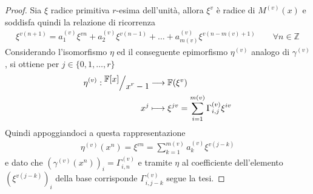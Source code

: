 \begin{proof}
   Sia $\xi$ radice primitiva $r$-esima dell'unità, allora $\xi^{v}$ è radice di $M^{(v)}(x)$ e soddisfa quindi la relazione di ricorrenza
   \begin{align*}
      \xi^{v(n+1)} = a_{1}^{(v)}\xi^{vn} + a_{2}^{(v)}\xi^{v(n-1)} + \dots  + a_{m(v)}^{(v)}\xi^{v(n-m(v)+1)}
      \qquad
      \forall n \in \mathbb{Z}
   \end{align*}
   Considerando l'isomorfismo $\eta$ ed il conseguente epimorfismo $\eta^{(v)}$ analogo di $\gamma^{(v)}$, si ottiene per $j \in \lbrace  0,1, \dots, r \rbrace$
   \begin{align*}
        \eta^{(v)} :  \quotient{\mathbb{F} \lbrack x \rbrack  }{x^{r} - 1}  
      & \longrightarrow  
       \mathbb{F} (\xi^{v})   \\
      x^{j} &\longmapsto  \xi^{jv} = \sum_{i=1}^{m(v)} \Gamma_{i,j}^{(v)}\xi^{iv}
   \end{align*}
   Quindi appoggiandoci a questa rappresentazione
   \begin{align*}
      \eta^{(v)}(x^n) = \xi^{vn} = \sum_{k=1}^{m(v)}a_{k}^{(v)}\xi^{v(j-k)}
   \end{align*}
   e dato che $(\gamma^{(v)}(x^{n}))_{i} = \Gamma_{i,n}^{(v)}$ e tramite $\eta$ al coefficiente dell'elemento $(\xi^{v(j-k)})_{i}$ della base corrisponde $\Gamma_{i,j-k}^{(v)}$ segue la tesi.
\end{proof}

